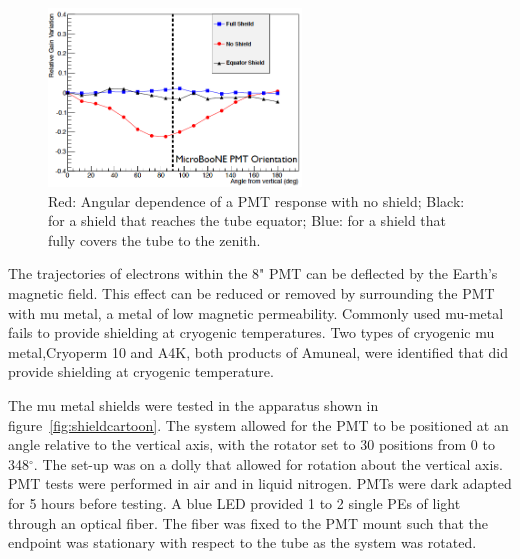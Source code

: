 \begin{figure}[t]
\centering 
\includegraphics[width=0.6\textwidth]{./light_figures/shield.png}
\caption{Red:  Angular dependence of a PMT response with no shield;  Black:  for a shield that reaches the tube equator;  Blue: for a shield that fully covers the tube to the zenith. \label{fig:shield}  }
\end{figure}



The trajectories of electrons within the 8" PMT can be deflected by the Earth's magnetic field.  This effect can be reduced or removed by surrounding the PMT with mu metal, a metal of low magnetic permeability.  Commonly used mu-metal fails to provide shielding at cryogenic temperatures. Two types of cryogenic mu metal,Cryoperm 10 and A4K, both products of Amuneal, were identified that did provide shielding at cryogenic temperature. 

The mu metal shields were tested in the apparatus shown in figure~\ref{fig:shieldcartoon}.  The system allowed for the PMT to be positioned at an angle relative to the vertical axis, with the rotator set to 30 positions from 0 to 348$^\circ$.    The set-up was on a dolly that allowed for rotation about the vertical axis.  PMT tests were performed in air and in liquid nitrogen.   PMTs were dark adapted for 5 hours before testing.  %
A blue LED provided 1 to 2 single PEs of light through an optical fiber.   The fiber was fixed to the PMT mount such that the endpoint was stationary with respect to the tube as the system was rotated.   

